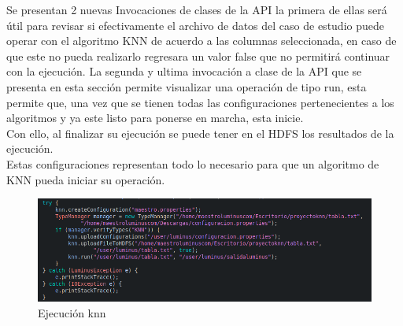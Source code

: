 Se presentan 2 nuevas Invocaciones de clases de la API la primera de ellas será útil para revisar si efectivamente el archivo de datos del caso de estudio puede operar con el algoritmo KNN de acuerdo a las columnas seleccionada, en caso de que este no pueda realizarlo regresara un valor false que no permitirá continuar con la ejecución.
La segunda y ultima invocación a clase de la API que se presenta en esta sección permite visualizar una operación de tipo run, esta permite que, una vez que se tienen todas las configuraciones pertenecientes a los algoritmos y ya este listo para ponerse en marcha, esta inicie. \\
Con ello, al finalizar su ejecución se puede tener en el HDFS los resultados de la ejecución.\\
Estas configuraciones representan todo lo necesario para que un algoritmo de KNN pueda iniciar su operación.\\
\begin{figure}[H]
	\begin{center}
		\hypertarget{fig:defichida}{\hspace{1pt}}
		\includegraphics[width=1\textwidth]{capitulo4b/images/apiknn.png}
		\caption{Ejecución knn}
		\label{fig:defichida}
	\end{center}
\end{figure}
